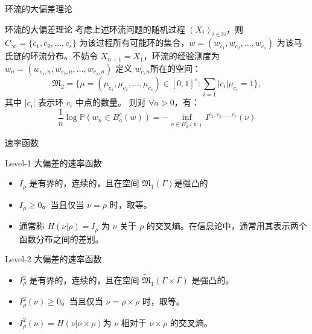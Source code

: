 \documentclass{beamer}
\begin{document}
	\begin{frame}{环流的大偏差理论}
		\begin{block}{环流的大偏差理论}
			考虑上述环流问题的随机过程 $(\mathit{X}_i)_{i\in \mathbb{N}}$，则 $C_{\infty}=\{c_1, c_2, \dots, c_s\}$ 为该过程所有可能环的集合，$\mathit{w} = \left(\mathit{w}_{c_1}, \mathit{w}_{c_2}, \dots, \mathit{w}_{c_s}\right)$ 为该马氏链的环流分布。不妨令 $\mathit{X}_{n+1} = \mathit{X}_1$，环流的经验测度为 $\mathit{w}_n = \left(\mathit{w}_{c_1, n}, \mathit{w}_{c_2, n}, \dots, \mathit{w}_{c_s, n}\right)$
			定义 $\mathit{w}_{c, n}$所在的空间：
			$$
			\mathfrak{M}_2 = \{\mu=\left(\mu_{c_1}, \mu_{c_2}, \dots, \mu_{c_s}\right)\in \left[0, 1\right]^s: \sum_{i=1} |c_i| \mu_{c_i}=1\}, 
			$$
			其中 $|c_i|$ 表示环 $c_i$ 中点的数量。
			则对 $\forall a >0$，有：
			$$
			\frac{1}{n} \log \mathbb{P} \left(\mathit{w}_n \in B_a^c(\mathit{w})\right) = - \inf_{\nu \in B_a^c(\mathit{w})} \mathit{I}^{c_1, c_2, \dots, c_s}(\nu)
			$$
		\end{block}
	\end{frame}

	\begin{frame}{速率函数}
		\begin{block}{Level-1 大偏差的速率函数}
			\begin{itemize}
				\item $\mathit{I}_{\rho}$ 是有界的，连续的，且在空间 $\mathfrak{M}_1(\Gamma)$是强凸的
				\item $\mathit{I}_{\rho} \ge 0$。当且仅当 $\nu = \rho$ 时，取等。
				\item 通常称 $\mathit{H}(\nu | \rho) = \mathit{I}_{\rho}$ 为 $\nu$ 关于 $\rho$ 的交叉熵。在信息论中，通常用其表示两个函数分布之间的差别。
			\end{itemize}
		\end{block}

		\begin{block}{Level-2 大偏差的速率函数}
			\begin{itemize}
				\item $\mathit{I}^2_{\rho}$ 是有界的，连续的，且在空间 $\widetilde{\mathfrak{M}}_1(\Gamma \times \Gamma)$ 是强凸的。
				\item $\mathit{I}^2_{\rho}(\nu) \ge 0$。当且仅当 $\nu = \rho \times \rho$ 时，取等。
				\item $\mathit{I}_{\rho}^2(\nu) = \mathit{H}(\nu | \bar{\nu} \times \rho)$为 $\nu$ 相对于 $\bar{\nu} \times \rho$ 的交叉熵。
			\end{itemize}
		\end{block}
	\end{frame}
\end{document}
